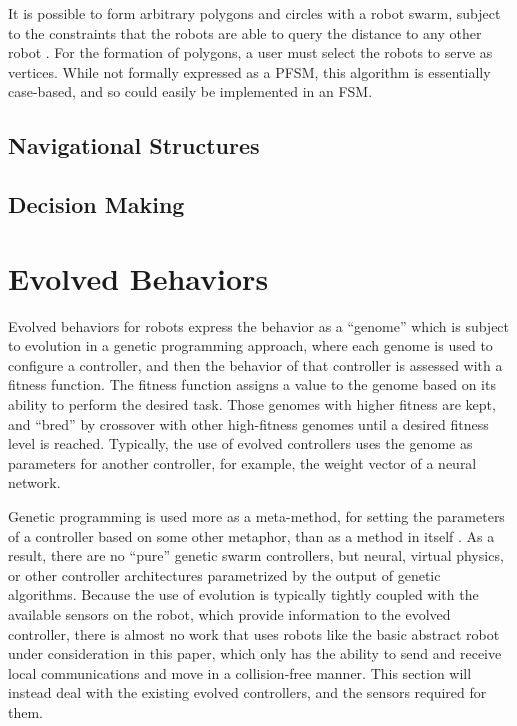 \documentclass[]{article}
\begin{document}
It is possible to form arbitrary polygons and circles with a robot swarm, subject to the constraints that the robots are able to query the distance to any other robot \cite{sugihara1996distributed}.
For the formation of polygons, a user must select the robots to serve as vertices. 
While not formally expressed as a PFSM, this algorithm is essentially case-based, and so could easily be implemented in an FSM. 

\subsection{Navigational Structures}

\subsection{Decision Making}

\section{Evolved Behaviors}

Evolved behaviors for robots express the behavior as a ``genome'' which is subject to evolution in a genetic programming approach, where each genome is used to configure a controller, and then the behavior of that controller is assessed with a fitness function. 
The fitness function assigns a value to the genome based on its ability to perform the desired task. 
Those genomes with higher fitness are kept, and ``bred'' by crossover with other high-fitness genomes until a desired fitness level is reached. 
Typically, the use of evolved controllers uses the genome as parameters for another controller, for example, the weight vector of a neural network. 

Genetic programming is used more as a meta-method, for setting the parameters of a controller based on some other metaphor, than as a method in itself \cite{fehervari2013evolution}. 
As a result, there are no ``pure'' genetic swarm controllers, but neural, virtual physics, or other controller architectures parametrized by the output of genetic algorithms. 
Because the use of evolution is typically tightly coupled with the available sensors on the robot, which provide information to the evolved controller, there is almost no work that uses robots like the basic abstract robot under consideration in this paper, which only has the ability to send and receive local communications and move in a collision-free manner. 
This section will instead deal with the existing evolved controllers, and the sensors required for them. 
\end{document}

